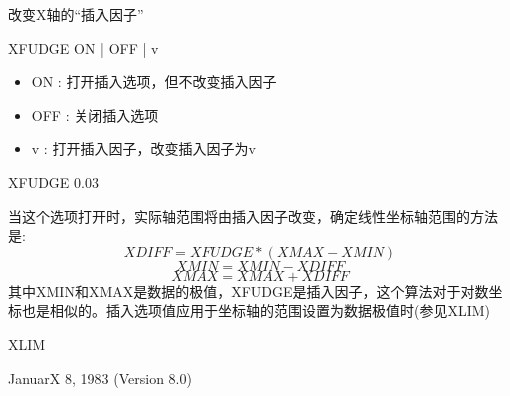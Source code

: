 \label{cmd:xfudge}

改变X轴的``插入因子''

XFUDGE ON | OFF | v

\begin{itemize}
\item ON : 打开插入选项，但不改变插入因子 
\item OFF : 关闭插入选项 
\item v : 打开插入因子，改变插入因子为v 
\end{itemize}

XFUDGE 0.03

当这个选项打开时，实际轴范围将由插入因子改变，确定线性坐标轴范围的方法是:
\[ XDIFF=XFUDGE*(XMAX-XMIN) \]
\[ XMIN=XMIN-XDIFF \]
\[ XMAX=XMAX+XDIFF \]
其中XMIN和XMAX是数据的极值，XFUDGE是插入因子，这个算法对于对数坐标也是相似的。插入选项值应用于坐标轴的范围设置为数据极值时(参见XLIM)

XLIM

JanuarX 8, 1983 (Version 8.0)
